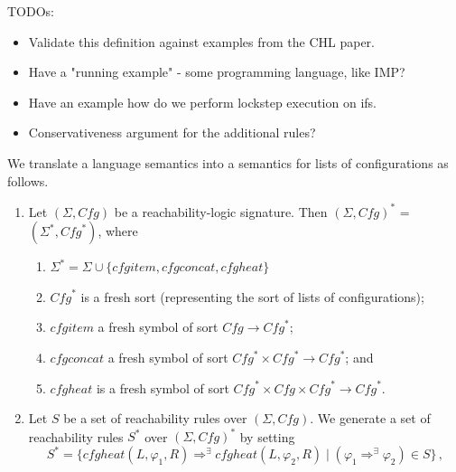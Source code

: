 \documentclass{article}
\begin{document}
TODOs:
\begin{itemize}
    \item Validate this definition against examples from the CHL paper.
    \item Have a "running example" - some programming language, like IMP?
    \item Have an example how do we perform lockstep execution on ifs.
    \item Conservativeness argument for the additional rules?
\end{itemize}

\begin{definition}
We translate a language semantics into a semantics for lists of configurations as follows.
\begin{enumerate}
    \item Let $(\Sigma, \mathit{Cfg})$ be a reachability-logic signature.
          Then $(\Sigma, \mathit{Cfg})^*$ = $(\Sigma^*, \mathit{Cfg}^*)$,
          where
          \begin{enumerate}
              \item $\Sigma^* = \Sigma \cup \{ \mathit{cfgitem}, \mathit{cfgconcat},
          \mathit{cfgheat} \}$
              \item $\mathit{Cfg}^*$ is a fresh sort (representing the sort of lists of configurations);
              \item $\mathit{cfgitem}$ a fresh symbol of sort $\mathit{Cfg} \to \mathit{Cfg}^*$;
              \item $\mathit{cfgconcat}$ a fresh symbol of sort $\mathit{Cfg}^* \times \mathit{Cfg}^* \to \mathit{Cfg}^*$; and
              \item $\mathit{cfgheat}$ is a fresh symbol of sort $\mathit{Cfg}^* \times \mathit{Cfg} \times \mathit{Cfg}^* \to \mathit{Cfg}^*$.
          \end{enumerate}
    \item Let $S$ be a set of reachability rules over $(\Sigma, \mathit{Cfg})$.
          We generate a set of reachability rules $S^*$ over $(\Sigma, \mathit{Cfg})^*$
          by setting
          \begin{equation*}
              S^* = \{ \mathit{cfgheat}(L, \varphi_1, R) \Rightarrow^\exists \mathit{cfgheat}(L, \varphi_2, R) \mid (\varphi_1 \Rightarrow^\exists \varphi_2) \in S \} \, ,
          \end{equation*}

\end{enumerate}
\end{definition}
\end{document}
